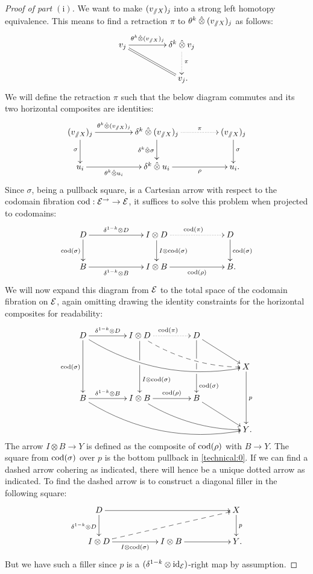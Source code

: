 \documentclass[reqno,10pt,a4paper,oneside,draft]{amsart}
\begin{document}
\begin{proof}[Proof of part $\mathrm{(i)}$]
We want to make $(v_{\sslash X})_j$ into a strong left homotopy equivalence.
This means to find a retraction $\pi$ to $\theta^k \mathbin{\hat{\otimes}} (v_{\sslash X})_j$ as follows:
\[
\xymatrix@C+2em{
  v_{j}
  \ar[r]^-{\thetak \hatotimes (v_{\fakeslice X})_j}
  \ar@{=}[dr]
&
  \kcyl \hatotimes v_{j}
  \ar@{.>}[d]^{\pi}
\\&
  v_{j}
\rlap{.}}
\]
We will define the retraction $\pi$ such that the below diagram commutes and its two horizontal composites are identities:
\[
\xymatrix@C+2em{
  (v_{\fakeslice X})_{j}
  \ar[r]^-{\thetak \hatotimes (v_{\fakeslice X})_j}
  \ar[d]_{\sigma}
&
  \kcyl \hatotimes (v_{\fakeslice X})_{j}
  \ar@{.>}[r]^-{\pi}
  \ar[d]_{\kcyl \hatotimes \sigma}
&
  (v_{\fakeslice X})_{j}
  \ar[d]^{\sigma}
\\
  u_i
  \ar[r]_-{\thetak \hatotimes u_i}
&
  \kcyl \hatotimes u_i
  \ar[r]_-{\rho}
&
  u_i
\rlap{.}}
\]
Since $\sigma$, being a pullback square, is a Cartesian arrow with respect to the codomain fibration $\operatorname{cod} : \mathcal{E}^\to \to \mathcal{E}$, it suffices to solve this problem when projected to codomains:
\[
\xymatrix@C+4em{
  D
  \ar[r]^-{\kcylinv \otimes D}
  \ar[d]_{\cod(\sigma)}
&
  \interval \otimes D
  \ar@{.>}[r]^{\cod(\pi)}
  \ar[d]^{\interval \otimes \cod(\sigma)}
&
  D
  \ar[d]^{\cod(\sigma)}
\\
  B
  \ar[r]_-{\kcylinv \otimes B}
&
  \interval \otimes B
  \ar[r]_-{\cod(\rho)}
&
  B
\rlap{.}}
\]
We will now expand this diagram from $\mathcal{E}$ to the total space of the codomain fibration on $\mathcal{E}$, again omitting drawing the identity constraints for the horizontal composites for readability:
\[
\xymatrix@C+2em{
  D
  \ar[r]^-{\kcylinv \otimes D}
  \ar[dd]_{\cod(\sigma)}
  \ar@/_2em/[drrr]
&
  \interval \otimes D
  \ar@{.>}[r]^{\cod(\pi)}
  \ar[dd]^(0.7){\interval \otimes \cod(\sigma)}|(0.43){\hole}
  \ar@{-->}@/_1em/[drr]
&
  D
  \ar[dd]^(0.8){\cod(\sigma)}|(0.40){\hole}|(0.57){\hole}
  \ar[dr]
\\&&&
  X
  \ar[dd]^{p}
\\
  B
  \ar[r]^-{\kcylinv \otimes B}
  \ar@/_2em/[drrr]
&
  \interval \otimes B
  \ar[r]^-{\cod(\rho)}
  \ar@/_1em/[drr]
&
  B
  \ar[dr]
\\&&&
  Y
\rlap{.}}
\]
The arrow $I \otimes B \to Y$ is defined as the composite of $\operatorname{cod}(\rho)$ with $B \to Y$.
The square from $\operatorname{cod}(\sigma)$ over $p$ is the bottom pullback in \eqref{technical:0}.
If we can find a dashed arrow cohering as indicated, there will hence be a unique dotted arrow as indicated.
To find the dashed arrow is to construct a diagonal filler in the following square:
\[
\xymatrix@C+3em{
  D
  \ar[rr]
  \ar[d]_{\kcylinv \otimes D}
&&
  X
  \ar[d]^{p}
\\
  \interval \otimes D
  \ar[r]_{I \otimes \cod(\sigma)}
  \ar@{-->}[urr]
&
  \interval \otimes B
  \ar[r]
&
  Y
\rlap{.}}
\]
But we have such a filler since $p$ is a $(\delta^{1-k} \otimes \operatorname{id}_{\mathcal{E}})$-right map by assumption.


\end{proof}
\end{document}
